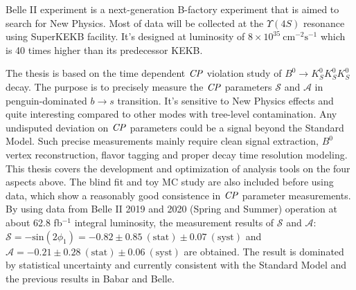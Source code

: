 % 
% 
%
Belle II experiment is a next-generation B-factory experiment that is aimed to search for New Physics. Most of data will be collected at the $\Upsilon(4S)$ resonance using SuperKEKB facility. It's designed at luminosity of $8 \times 10^{35}~ \text{cm}^{-2}\text{s}^{-1}$ which is 40 times higher than its predecessor KEKB.

The thesis is based on the time dependent $\it{CP}$ violation study of $B^0 \to K_S^0 K_S^0 K_S^0$ decay. The purpose is to precisely measure the $\it{CP}$ parameters $\mathcal{S}$ and $\mathcal{A}$ in penguin-dominated $b \to s$ transition. It's sensitive to New Physics effects and quite interesting compared to other modes with tree-level contamination. Any undisputed deviation on $\it{CP}$ parameters could be a signal beyond the Standard Model. Such precise measurements mainly require clean signal extraction, $B^0$ vertex reconstruction, flavor tagging and proper decay time resolution modeling. This thesis covers the development and optimization of analysis tools on the four aspects above. The blind fit and toy MC study are also included before using data, which show a reasonably good consistence in $\it{CP}$ parameter measurements. By using data from Belle II 2019 and 2020 (Spring and Summer) operation at about 62.8 fb$^{-1}$ integral luminosity, the measurement results of $\mathcal{S}$ and $\mathcal{A}$: $\mathcal{S}= - \text{sin}(2\phi_1) = -0.82 \pm 0.85 \: (\text{stat}) \pm 0.07 \: (\text{syst})$ and $\mathcal{A}= -0.21 \pm 0.28 \: (\text{stat}) \pm 0.06 \: (\text{syst})$ are obtained. The result is dominated by statistical uncertainty and currently consistent with the Standard Model and the previous results in Babar and Belle. 




 

